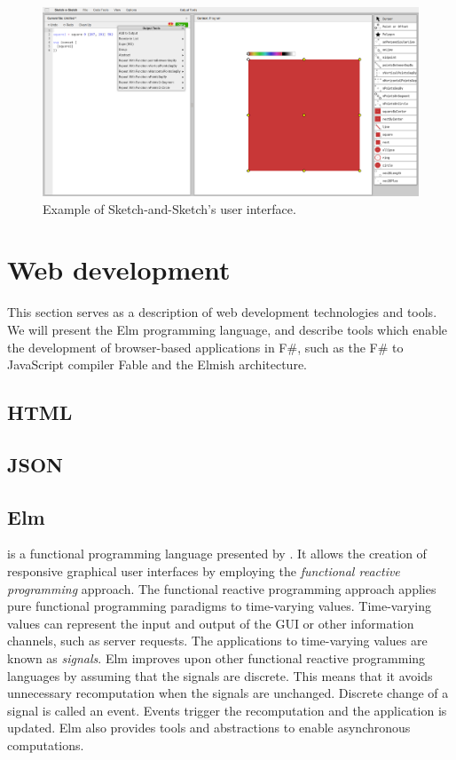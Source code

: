 \begin{figure}[h]
	\centering
	\includegraphics[width=1\linewidth]{img/sketch.pdf}
	\caption{Example of Sketch-and-Sketch's user interface. }
	\label{fig:sketch}
\end{figure}

\section{Web development}

This section serves as a description of web development technologies and tools.
We will present the Elm programming language,
and describe tools which enable the development of browser-based applications in F\#, such as the F\# to JavaScript compiler Fable and the Elmish architecture.

\subsection{HTML}
\subsection{JSON}

\subsection{Elm}
\citet{eml} is a functional programming language presented by \citet{Czaplicki_Chong_2013}.
It allows the creation of responsive graphical user interfaces by employing the
\emph{functional reactive programming} approach. The functional reactive programming
approach applies pure functional programming paradigms to time-varying values.
Time-varying values can represent the input and output of the GUI or other information
channels, such as server requests. The applications to time-varying values are known
as \emph{signals}. Elm improves upon other functional reactive programming languages
by assuming that the signals are discrete. This means that it avoids unnecessary
recomputation when the signals are unchanged. Discrete change of a signal is called
an event. Events trigger the recomputation and the application is updated. Elm also
provides tools and abstractions to enable asynchronous computations.

